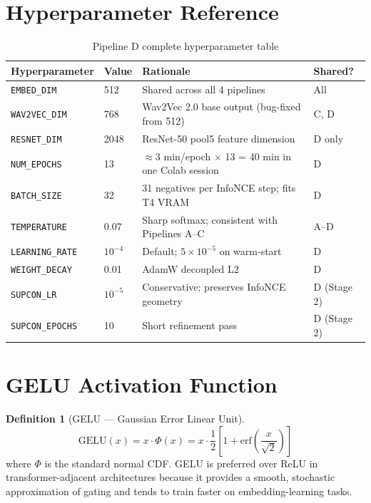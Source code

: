 \documentclass[12pt,a4paper]{article}
\theoremstyle{definition}
\newtheorem{definition}[theorem]{Definition}
\theoremstyle{remark}
\begin{document}
\section{Hyperparameter Reference}

\begin{table}[H]
\centering
\caption{Pipeline D complete hyperparameter table}
\begin{tabularx}{\textwidth}{llXl}
\toprule
Hyperparameter & Value & Rationale & Shared? \\
\midrule
\texttt{EMBED\_DIM} & 512 & Shared across all 4 pipelines & All \\
\texttt{WAV2VEC\_DIM} & 768 & Wav2Vec 2.0 base output (bug-fixed from 512) & C, D \\
\texttt{RESNET\_DIM} & 2048 & ResNet-50 pool5 feature dimension & D only \\
\texttt{NUM\_EPOCHS} & 13 & $\approx$3 min/epoch $\times$ 13 = 40 min in one Colab session & D \\
\texttt{BATCH\_SIZE} & 32 & 31 negatives per InfoNCE step; fits T4 VRAM & D \\
\texttt{TEMPERATURE} & 0.07 & Sharp softmax; consistent with Pipelines A–C & A–D \\
\texttt{LEARNING\_RATE} & $10^{-4}$ & Default; $5\times10^{-5}$ on warm-start & D \\
\texttt{WEIGHT\_DECAY} & 0.01 & AdamW decoupled L2 & D \\
\texttt{SUPCON\_LR} & $10^{-5}$ & Conservative; preserves InfoNCE geometry & D (Stage 2) \\
\texttt{SUPCON\_EPOCHS} & 10 & Short refinement pass & D (Stage 2) \\
\bottomrule
\end{tabularx}
\end{table}

\section{GELU Activation Function}

\begin{definition}[GELU — Gaussian Error Linear Unit]
\[
  \text{GELU}(x) = x \cdot \Phi(x) = x \cdot \frac{1}{2}\left[1 + \text{erf}\!\left(\frac{x}{\sqrt{2}}\right)\right]
\]
where $\Phi$ is the standard normal CDF. GELU is preferred over ReLU in
transformer-adjacent architectures because it provides a smooth, stochastic
approximation of gating and tends to train faster on embedding-learning tasks.
\end{definition}
\end{document}
